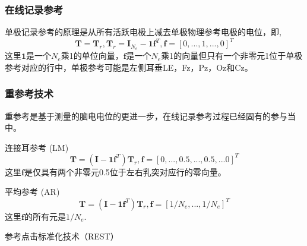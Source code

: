\subsubsection{在线记录参考}
单极记录参考的原理是从所有活跃电极上减去单极物理参考电极的电位，即,
\begin{equation}\label{eq2.4}
\mathbf{T}=\mathbf{T}_{r},\mathbf{T}_{r}=\mathbf{I}_{N_{e}}-\mathbf{1f}^T,\mathbf{f}=[0,...,1,...,0]^T
\end{equation}
这里$\mathbf{1}$是一个$N_e$乘1的单位向量，$\mathbf{f}$是一个$N_e$乘1的向量但只有一个非零元1位于单极参考对应的行中，单极参考可能是左侧耳垂LE，Fz，Pz，Oz和Cz。

\subsubsection{重参考技术}
重参考是基于测量的脑电电位的更进一步，在线记录参考过程已经固有的参与当中。

连接耳参考 (LM)
\begin{equation}\label{eq2.5}
\mathbf{T}=(\mathbf{I}-\mathbf{1f}^T)\mathbf{T}_r,\mathbf{f}=[0,...,0.5,...,0.5,...0]^T
\end{equation}
这里$\mathbf{f}$是仅具有两个非零元0.5位于左右乳突对应行的零向量。

平均参考 (AR)
\begin{equation}\label{eq2.6}
\mathbf{T}=(\mathbf{I}-\mathbf{1f}^T)\mathbf{T}_r,\mathbf{f}=[1/{N_e},...,1/{N_e}]^T
\end{equation}
这里$\mathbf{f}$的所有元是$1/{N_e}$.

参考点击标准化技术（REST）


